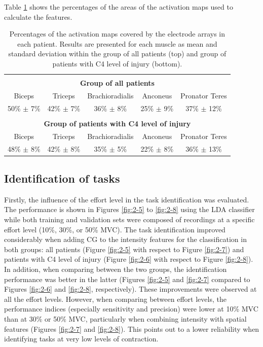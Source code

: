 Table \ref{tb:2-2} shows the percentages of the areas of the activation maps used to calculate the features.

\begin{table}[]
\centering
\caption{Percentages of the activation maps covered by the electrode arrays in each patient. Results are presented for each muscle as mean and standard deviation within the group of all patients (top) and group of patients with C4 level of injury (bottom).}
\label{tb:2-2}
\begin{tabular}{ccccc}
 & & & &\\
               \multicolumn{5}{c}{\textbf{Group of all patients}}                     \\
Biceps         & Triceps         & Brachioradialis  & Anconeus        & Pronator Teres  \\\hline
        
50\% $\pm$ 7\% & 42\% $\pm$ 7\%  & 36\% $\pm$ 8\%   & 25\% $\pm$ 9\%  & 37\% $\pm$ 12\% \\
               &                 &                  &                 &                 \\
              \multicolumn{5}{c}{\textbf{Group of patients with C4 level of injury}} \\
Biceps         & Triceps         & Brachioradialis  & Anconeus        & Pronator Teres  \\ \hline
     
48\% $\pm$ 8\% & 42\% $\pm$ 8\%  & 35\% $\pm$ 5\%   & 22\% $\pm$ 8\%  & 36\% $\pm$ 13\%
\end{tabular}
\end{table}


\subsection{Identification of tasks}
Firstly, the influence of the effort level in the task identification was evaluated. The performance is shown in Figures \ref{fig:2-5} to \ref{fig:2-8} using the LDA classifier while both training and validation sets were composed of recordings at a specific effort level (10\%, 30\%, or 50\% MVC). The task identification improved considerably when adding CG to the intensity features for the classification in both groups: all patients (Figure \ref{fig:2-5} with respect to Figure \ref{fig:2-7}) and patients with C4 level of injury (Figure \ref{fig:2-6} with respect to Figure \ref{fig:2-8}). In addition, when comparing between the two groups, the identification performance was better in the latter (Figures \ref{fig:2-5} and \ref{fig:2-7} compared to Figures \ref{fig:2-6} and \ref{fig:2-8}, respectively). These improvements were observed at all the effort levels. However, when comparing between effort levels, the performance indices (especially sensitivity and precision) were lower at 10\% MVC than at 30\% or 50\% MVC, particularly when combining intensity with spatial features (Figures \ref{fig:2-7} and \ref{fig:2-8}). This points out to a lower reliability when identifying tasks at very low levels of contraction. 

